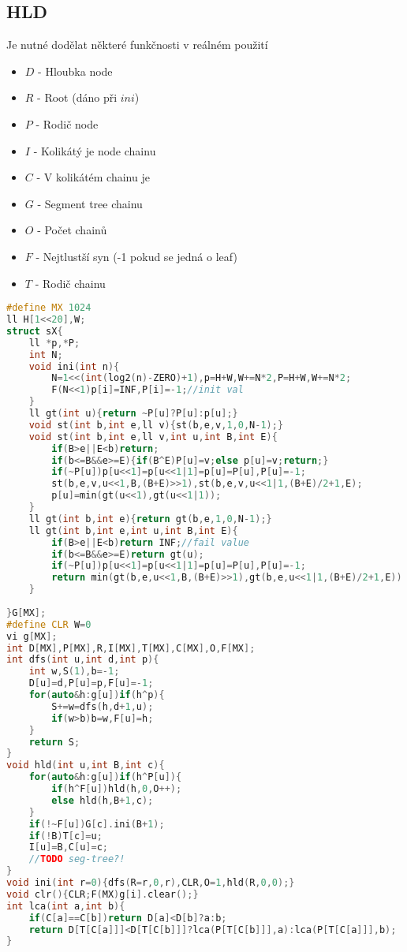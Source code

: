 \documentclass[11pt]{article}
\begin{document}
\subsection{HLD}
Je nutné dodělat některé funkčnosti v reálném použití
\begin{itemize}
\item $D$ - Hloubka node
\item $R$ - Root (dáno při $ini$)
\item $P$ - Rodič node
\item $I$ - Kolikátý je node chainu
\item $C$ - V kolikátém chainu je
\item $G$ - Segment tree chainu
\item $O$ - Počet chainů
\item $F$ - Nejtlustší syn (-1 pokud se jedná o leaf)
\item $T$ - Rodič chainu
\end{itemize}
\begin{lstlisting}[language=C++]
#define MX 1024
ll H[1<<20],W;
struct sX{
    ll *p,*P;
    int N;
    void ini(int n){
        N=1<<(int(log2(n)-ZERO)+1),p=H+W,W+=N*2,P=H+W,W+=N*2;
        F(N<<1)p[i]=INF,P[i]=-1;//init val
    }
    ll gt(int u){return ~P[u]?P[u]:p[u];}
    void st(int b,int e,ll v){st(b,e,v,1,0,N-1);}
    void st(int b,int e,ll v,int u,int B,int E){
        if(B>e||E<b)return;
        if(b<=B&&e>=E){if(B^E)P[u]=v;else p[u]=v;return;}
        if(~P[u])p[u<<1]=p[u<<1|1]=p[u]=P[u],P[u]=-1;
        st(b,e,v,u<<1,B,(B+E)>>1),st(b,e,v,u<<1|1,(B+E)/2+1,E);
        p[u]=min(gt(u<<1),gt(u<<1|1));
    }
    ll gt(int b,int e){return gt(b,e,1,0,N-1);}
    ll gt(int b,int e,int u,int B,int E){
        if(B>e||E<b)return INF;//fail value
        if(b<=B&&e>=E)return gt(u);
        if(~P[u])p[u<<1]=p[u<<1|1]=p[u]=P[u],P[u]=-1;
        return min(gt(b,e,u<<1,B,(B+E)>>1),gt(b,e,u<<1|1,(B+E)/2+1,E));
    }
    
}G[MX];
#define CLR W=0
vi g[MX];
int D[MX],P[MX],R,I[MX],T[MX],C[MX],O,F[MX];
int dfs(int u,int d,int p){
    int w,S(1),b=-1;
    D[u]=d,P[u]=p,F[u]=-1;
    for(auto&h:g[u])if(h^p){
        S+=w=dfs(h,d+1,u);
        if(w>b)b=w,F[u]=h;
    }
    return S;
}
void hld(int u,int B,int c){
    for(auto&h:g[u])if(h^P[u]){
        if(h^F[u])hld(h,0,O++);
        else hld(h,B+1,c);
    }
    if(!~F[u])G[c].ini(B+1);
    if(!B)T[c]=u;
    I[u]=B,C[u]=c;
    //TODO seg-tree?!
}
void ini(int r=0){dfs(R=r,0,r),CLR,O=1,hld(R,0,0);}
void clr(){CLR;F(MX)g[i].clear();}
int lca(int a,int b){
    if(C[a]==C[b])return D[a]<D[b]?a:b;
    return D[T[C[a]]]<D[T[C[b]]]?lca(P[T[C[b]]],a):lca(P[T[C[a]]],b);
}
\end{lstlisting}
\end{document}
